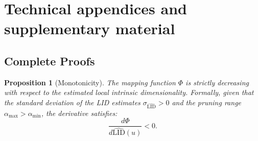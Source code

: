 \documentclass{article}
\theoremstyle{plain}
\newtheorem{proposition}[theorem]{Proposition}
\theoremstyle{definition}
\theoremstyle{remark}
\begin{document}



\clearpage


\clearpage
\appendix

\section{Technical appendices and supplementary material}

\subsection{Complete Proofs}
\label{appendix:proofs}

\begin{proposition}[Monotonicity]\label{proof:mono}
The mapping function $\Phi$ is strictly decreasing with respect to the estimated local intrinsic dimensionality. Formally, given that the standard deviation of the LID estimates $\sigma_{\widehat{\text{LID}}} > 0$ and the pruning range $\alpha_{\max} > \alpha_{\min}$, the derivative satisfies:
\begin{equation}
    \frac{d \Phi}{d \widehat{\text{LID}}(u)} < 0.
\end{equation}
\end{proposition}
\end{document}
